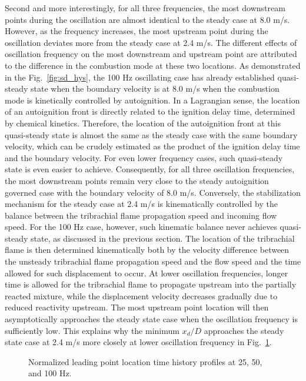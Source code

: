 \documentclass[review,3p,times]{elsarticle}
\begin{document}
\textcolor{Rev1}{Second and more interestingly, for all three frequencies, the most downstream points during the oscillation are almost identical to the steady case at 8.0 m/s.  However, as the frequency increases, the most upstream point during the oscillation deviates more from the steady case at 2.4 m/s.  The different effects of oscillation frequency on the most downstream and upstream point are attributed to the difference in the combustion mode at these two locations.  As demonstrated in the Fig.~\ref{fig:sd_hys}, the 100 Hz oscillating case has already established quasi-steady state when the boundary velocity is at 8.0 m/s when the combustion mode is kinetically controlled by autoignition.  In a Lagrangian sense, the location of an autoignition front is directly related to the ignition delay time, determined by chemical kinetics.  Therefore, the location of the autoignition front at this quasi-steady state is almost the same as the steady case with the same boundary velocity, which can be crudely estimated as the product of the ignition delay time and the boundary velocity.  For even lower frequency cases, such quasi-steady state is even easier to achieve.  Consequently, for all three oscillation frequencies, the most downstream points remain very close to the steady autoignition governed case with the boundary velocity of 8.0 m/s.  Conversely, the stabilization mechanism for the steady case at 2.4 m/s is kinematically controlled by the balance between the tribrachial flame propagation speed and incoming flow speed.  For the 100 Hz case, however, such kinematic balance never achieves quasi-steady state, as discussed in the previous section.  The location of the tribrachial flame is then determined kinematically both by the velocity difference between the unsteady tribrachial flame propagation speed and the flow speed and the time allowed for such displacement to occur.  At lower oscillation frequencies, longer time is allowed for the tribrachial flame to propagate upstream into the partially reacted mixture, while the displacement velocity decreases gradually due to reduced reactivity upstream.  The most upstream point location will then asymptotically approaches the steady state case when the oscillation frequency is sufficiently low.  This explains why the minimum $x_d/D$ approaches the steady state case at 2.4 m/s more closely at lower oscillation frequency in Fig.~\ref{fig:xd_evo}.}

\begin{figure}[t]
  \centering
  \scriptsize
  \resizebox{0.5\textwidth}{!}{}
  \normalsize
  \caption{\textcolor{Rev1}{Normalized leading point location time history profiles at 25, 50, and 100 Hz.}}
  \label{fig:xd_evo}
\end{figure}
\end{document}
